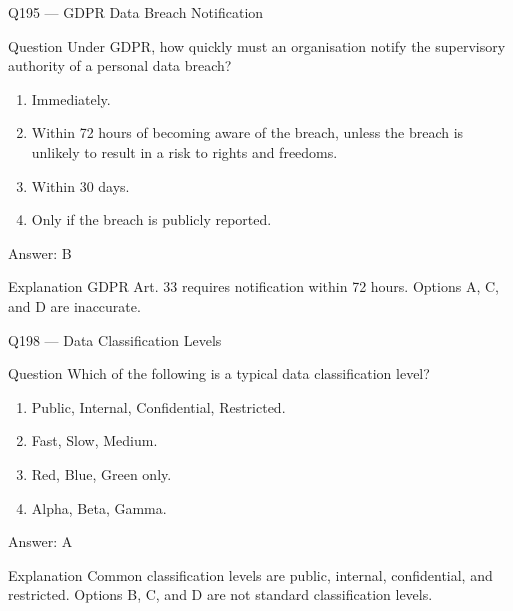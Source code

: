 \documentclass[aspectratio=169,8pt]{beamer}
\begin{document}
\begin{frame}{Q195 --- GDPR Data Breach Notification}
\begin{block}{Question}
Under GDPR, how quickly must an organisation notify the supervisory authority of a personal data breach?
\begin{enumerate}
\item Immediately.
\item Within 72 hours of becoming aware of the breach, unless the breach is unlikely to result in a risk to rights and freedoms.
\item Within 30 days.
\item Only if the breach is publicly reported.
\end{enumerate}  \end{block}
\begin{exampleblock}{Answer: B}\end{exampleblock}
\begin{block}{Explanation}
GDPR Art. 33 requires notification within 72 hours. Options A, C, and D are inaccurate.
\end{block}
\end{frame}




\begin{frame}{Q198 --- Data Classification Levels}
\begin{block}{Question}
Which of the following is a typical data classification level?
\begin{enumerate}
\item Public, Internal, Confidential, Restricted.
\item Fast, Slow, Medium.
\item Red, Blue, Green only.
\item Alpha, Beta, Gamma.
\end{enumerate}  \end{block}
\begin{exampleblock}{Answer: A}\end{exampleblock}
\begin{block}{Explanation}
Common classification levels are public, internal, confidential, and restricted. Options B, C, and D are not standard classification levels.
\end{block}
\end{frame}
\end{document}
